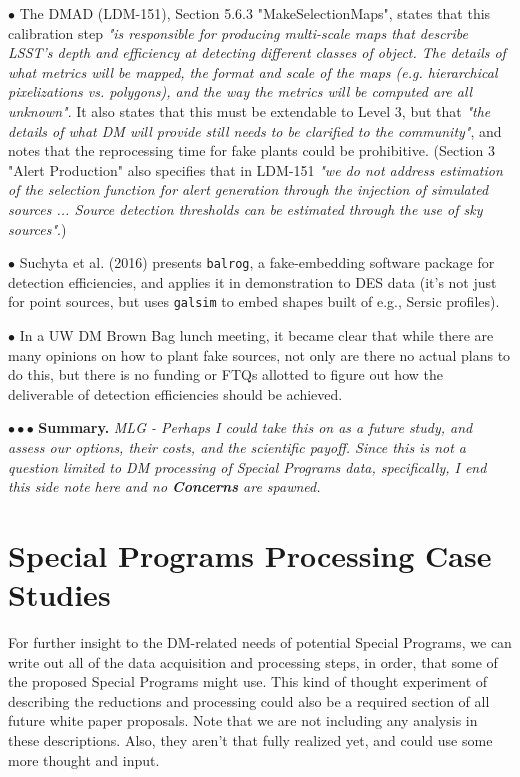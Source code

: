 \documentclass[DM,lsstdraft,toc]{lsstdoc}
\begin{document}
$\bullet$ The DMAD (LDM-151), Section 5.6.3 "MakeSelectionMaps", states that this calibration step {\it "is responsible for producing multi-scale maps that describe LSST's depth and efficiency at detecting different classes of object. The details of what metrics will be mapped, the format and scale of the maps (e.g. hierarchical pixelizations vs. polygons), and the way the metrics will be computed are all unknown"}. It also states that this must be extendable to Level 3, but that {\it "the details of what DM will provide still needs to be clarified to the community"}, and notes that the reprocessing time for fake plants could be prohibitive. (Section 3 "Alert Production" also specifies that in LDM-151 {\it "we do not address estimation of the selection function for alert generation through the injection of simulated sources ... Source detection thresholds can be estimated through the use of sky sources"}.)

$\bullet$ Suchyta et al. (2016) presents {\tt balrog}, a fake-embedding software package for detection efficiencies, and applies it in demonstration to DES data (it's not just for point sources, but uses {\tt galsim} to embed shapes built of e.g., Sersic profiles).

$\bullet$ In a UW DM Brown Bag lunch meeting, it became clear that while there are many opinions on how to plant fake sources, not only are there no actual plans to do this, but there is no funding or FTQs allotted to figure out how the deliverable of detection efficiencies should be achieved.

$\bullet \bullet \bullet$ {\bf Summary.} {\it MLG - Perhaps I could take this on as a future study, and assess our options, their costs, and the scientific payoff. Since this is not a question limited to DM processing of Special Programs data, specifically, I end this side note here and no {\bf Concerns} are spawned.}






\section{Special Programs Processing Case Studies}\label{sec:SPCS}

For further insight to the DM-related needs of potential Special Programs, we can write out all of the data acquisition and processing steps, in order, that some of the proposed Special Programs might use. This kind of thought experiment of describing the reductions and processing could also be a required section of all future white paper proposals. Note that we are not including any analysis in these descriptions. Also, they aren't that fully realized yet, and could use some more thought and input.
\end{document}
